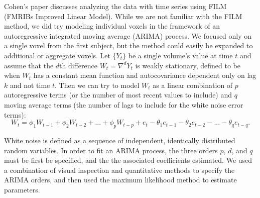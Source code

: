 \par \indent Cohen's paper discusses analyzing the data with time series using FILM (FMRIBs Improved Linear Model). While we are not familiar with the FILM method, we did try modeling individual voxels in the framework of an autoregressive integrated moving average (ARIMA) process. We focused only on a single voxel from the first subject, but the method could easily be expanded to additional or aggregate voxels. Let $\{Y_t\}$ be a single volume's value at time $t$ and assume that the $d$th difference $W_t = \nabla^d Y_t$ is weakly stationary, defined to be when $W_t$ has a constant mean function and autocovariance dependent only on lag $k$ and not time $t$. Then we can try to model $W_t$ as a linear combination of $p$ autoregressive terms (or the number of most recent values to include) and $q$ moving average terms (the number of lags to include for the white noise error terms): 
$$W_t = \phi_1 W_{t-1} + \phi_2 W_{t-2} + ... + \phi_p W_{t-p} + e_t - \theta_1 e_{t-1} - \theta_2 e_{t-2} - ... - \theta_q e_{t-q}.$$
\par White noise is defined as a sequence of independent, identically distributed random variables. In order to fit an ARIMA process, the three orders $p$, $d$, and $q$ must be first be specified, and the the associated coefficients estimated. We used a combination of visual inspection and quantitative methods to specify the ARIMA orders, and then used the maximum likelihood method to estimate parameters. 
